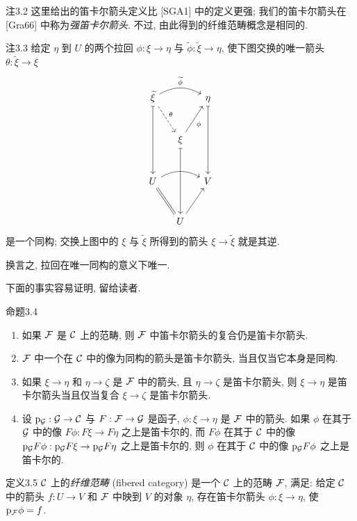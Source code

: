 \begin{origstatement}{注}{3.2}\label{ch03:rem32}
这里给出的笛卡尔箭头定义比 [SGA1] 中的定义更强; 我们的笛卡尔箭头在 [Gra66] 中称为\emph{强笛卡尔箭头}. 不过, 由此得到的纤维范畴概念是相同的.
\end{origstatement}

\begin{origstatement}{注}{3.3}\label{ch03:rem33}
给定 $\eta$ 到 $U$ 的两个拉回 $\phi:\xi\to\eta$ 与 $\widetilde\phi:\widetilde\xi\to\eta$, 使下图交换的唯一箭头 $\theta:\widetilde\xi\to\xi$
\[
\begin{tikzcd}[column sep=small,row sep=large]
\widetilde\xi\arrow[rr,bend left,"{\widetilde\phi}"]\arrow[dr,dashed,"{\theta}"]\arrow[dd,mapsto]&&\eta\arrow[dd,mapsto]\\
&\xi\arrow[ur,"{\phi}"']\arrow[dd,mapsto]&\\
U\arrow[rr,bend left]\arrow[dr,equal]&&V\\
&U\arrow[ur]&
\end{tikzcd}
\]
是一个同构; 交换上图中的 $\xi$ 与 $\widetilde\xi$ 所得到的箭头 $\xi\to\widetilde\xi$ 就是其逆.

换言之, 拉回在唯一同构的意义下唯一.
\end{origstatement}

下面的事实容易证明, 留给读者.

\begin{origstatement}{命题}{3.4}\label{ch03:prop34}
\begin{enumerate}
\item[(i)] 如果 $\mathcal F$ 是 $\mathcal C$ 上的范畴, 则 $\mathcal F$ 中笛卡尔箭头的复合仍是笛卡尔箭头.
\item[(ii)] $\mathcal F$ 中一个在 $\mathcal C$ 中的像为同构的箭头是笛卡尔箭头, 当且仅当它本身是同构.
\item[(iii)] 如果 $\xi\to\eta$ 和 $\eta\to\zeta$ 是 $\mathcal F$ 中的箭头, 且 $\eta\to\zeta$ 是笛卡尔箭头, 则 $\xi\to\eta$ 是笛卡尔箭头当且仅当复合 $\xi\to\zeta$ 是笛卡尔箭头.
\item[(iv)] 设 $\mathrm p_{\mathcal G}:\mathcal G\to\mathcal C$ 与 $F:\mathcal F\to\mathcal G$ 是函子, $\phi:\xi\to\eta$ 是 $\mathcal F$ 中的箭头. 如果 $\phi$ 在其于 $\mathcal G$ 中的像 $F\phi:F\xi\to F\eta$ 之上是笛卡尔的, 而 $F\phi$ 在其于 $\mathcal C$ 中的像 $\mathrm p_{\mathcal G} F\phi:\mathrm p_{\mathcal G} F\xi\to\mathrm p_{\mathcal G} F\eta$ 之上是笛卡尔的, 则 $\phi$ 在其于 $\mathcal C$ 中的像 $\mathrm p_{\mathcal G} F\phi$ 之上是笛卡尔的.
\end{enumerate}
\end{origstatement}

\begin{origstatement}{定义}{3.5}\label{ch03:def35}
$\mathcal C$ 上的\emph{纤维范畴} (fibered category) 是一个 $\mathcal C$ 上的范畴 $\mathcal F$, 满足: 给定 $\mathcal C$ 中的箭头 $f:U\to V$ 和 $\mathcal F$ 中映到 $V$ 的对象 $\eta$, 存在笛卡尔箭头 $\phi:\xi\to\eta$, 使 $\mathrm p_{\mathcal F}\phi=f$.
\end{origstatement}


